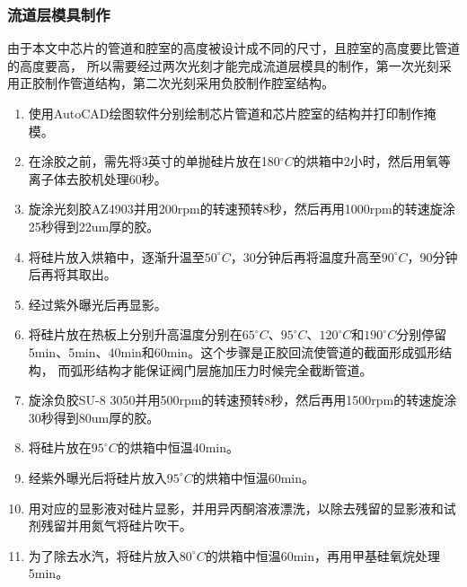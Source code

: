 \subsubsection{流道层模具制作}
	由于本文中芯片的管道和腔室的高度被设计成不同的尺寸，且腔室的高度要比管道的高度要高，
	所以需要经过两次光刻才能完成流道层模具的制作，第一次光刻采用正胶制作管道结构，第二次光刻采用负胶制作腔室结构。
	\begin{enumerate}[label={(\arabic*)},font={\color{black!50!black}\bfseries}]
	\item 使用AutoCAD绘图软件分别绘制芯片管道和芯片腔室的结构并打印制作掩模。
	\item 在涂胶之前，需先将3英寸的单抛硅片放在180$^\circ C$的烘箱中2小时，然后用氧等离子体去胶机处理60秒。
	\item 旋涂光刻胶AZ4903并用200rpm的转速预转8秒，然后再用1000rpm的转速旋涂25秒得到22um厚的胶。
	\item 将硅片放入烘箱中，逐渐升温至$50^\circ C$，30分钟后再将温度升高至$90^\circ C$，90分钟后再将其取出。
	\item 经过紫外曝光后再显影。
	\item 将硅片放在热板上分别升高温度分别在$65^\circ C$、$95^\circ C$、$120^\circ C$和$190^\circ C$分别停留
	5min、5min、40min和60min。这个步骤是正胶回流使管道的截面形成弧形结构，
		而弧形结构才能保证阀门层施加压力时候完全截断管道。
	\item 旋涂负胶SU-8 3050并用500rpm的转速预转8秒，然后再用1500rpm的转速旋涂30秒得到80um厚的胶。
	\item 将硅片放在$95^\circ C$的烘箱中恒温40min。
	\item 经紫外曝光后将硅片放入$95^\circ C$的烘箱中恒温60min。
	\item 用对应的显影液对硅片显影，并用异丙酮溶液漂洗，以除去残留的显影液和试剂残留并用氮气将硅片吹干。
	\item 为了除去水汽，将硅片放入$80^\circ C$的烘箱中恒温60min，再用甲基硅氧烷处理5min。
	\end{enumerate}
